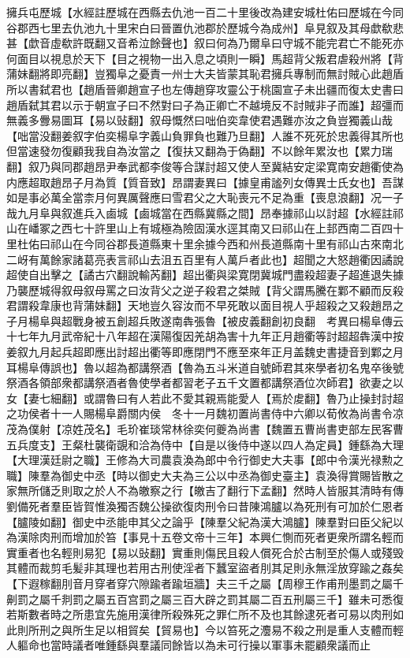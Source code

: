 擁兵屯歷城【水經註歷城在西縣去仇池一百二十里後改為建安城杜佑曰歷城在今同谷郡西七里去仇池九十里宋白曰晉置仇池郡於歷城今為成州】阜見叙及其母歔欷悲甚【歔音虛欷許既翻又音希泣餘聲也】叙曰何為乃爾阜曰守城不能完君亡不能死亦何面目以視息於天下【目之視物一出入息之頃則一瞬】馬超背父叛君虐殺州將【背蒲妹翻將即亮翻】豈獨阜之憂責一州士大夫皆蒙其恥君擁兵專制而無討賊心此趙盾所以書弑君也【趙盾晉卿趙宣子也左傳趙穿攻靈公于桃園宣子未出疆而復太史書曰趙盾弑其君以示于朝宣子曰不然對曰子為正卿亡不越境反不討賊非子而誰】超彊而無義多釁易圖耳【易以䜴翻】叙母慨然曰咄伯奕韋使君遇難亦汝之負豈獨義山哉【咄當没翻姜叙字伯奕楊阜字義山負罪負也難乃旦翻】人誰不死死於忠義得其所也但當速發勿復顧我我自為汝當之【復扶又翻為于偽翻】不以餘年累汝也【累力瑞翻】叙乃與同郡趙昂尹奉武都李俊等合謀討超又使人至冀結安定梁寛南安趙衢使為内應超取趙昂子月為質【質音致】昂謂妻異曰【據皇甫謐列女傳異士氏女也】吾謀如是事必萬全當柰月何異厲聲應曰雪君父之大恥喪元不足為重【喪息浪翻】况一子哉九月阜與叙進兵入鹵城【鹵城當在西縣冀縣之間】昂奉據祁山以討超【水經註祁山在嶓冢之西七十許里山上有城極為險固漢水逕其南又曰祁山在上邽西南二百四十里杜佑曰祁山在今同谷郡長道縣東十里余據今西和州長道縣南十里有祁山古來南北二岈有萬餘家諸葛亮表言祁山去沮五百里有人萬戶者此也】超聞之大怒趙衢因譎說超使自出擊之【譎古穴翻說輸芮翻】超出衢與梁寛閉冀城門盡殺超妻子超進退失據乃襲歷城得叙母叙母罵之曰汝背父之逆子殺君之桀賊【背父謂馬騰在鄴不顧而反殺君謂殺韋康也背蒲妹翻】天地豈久容汝而不早死敢以面目視人乎超殺之又殺趙昂之子月楊阜與超戰身被五創超兵敗遂南犇張魯【被皮義翻創初良翻　考異曰楊阜傳云十七年九月武帝紀十八年超在漢陽復因羌胡為害十九年正月趙衢等討超超犇漢中按姜叙九月起兵超即應出討超出衢等即應閉門不應至來年正月盖魏史書捷音到鄴之月耳楊阜傳誤也】魯以超為都講祭酒【魯為五斗米道自號師君其來學者初名鬼卒後號祭酒各領部衆都講祭酒者魯使學者都習老子五千文置都講祭酒位次師君】欲妻之以女【妻七細翻】或謂魯曰有人若此不愛其親焉能愛人【焉於䖍翻】魯乃止操封討超之功侯者十一人賜楊阜爵關内侯　冬十一月魏初置尚書侍中六卿以荀攸為尚書令凉茂為僕射【凉姓茂名】毛玠崔琰常林徐奕何夔為尚書【魏置五曹尚書吏部左民客曹五兵度支】王粲杜襲衛覬和洽為侍中【自是以後侍中遂以四人為定員】鍾繇為大理【大理漢廷尉之職】王修為大司農袁渙為郎中令行御史大夫事【郎中令漢光禄勲之職】陳羣為御史中丞【時以御史大夫為三公以中丞為御史臺主】袁渙得賞賜皆散之家無所儲乏則取之於人不為皦察之行【皦吉了翻行下孟翻】然時人皆服其清時有傳劉備死者羣臣皆賀惟渙獨否魏公操欲復肉刑令曰昔陳鴻臚以為死刑有可加於仁恩者【臚陵如翻】御史中丞能申其父之論乎【陳羣父紀為漢大鴻臚】陳羣對曰臣父紀以為漢除肉刑而增加於笞【事見十五卷文帝十三年】本興仁惻而死者更衆所謂名輕而實重者也名輕則易犯【易以䜴翻】實重則傷民且殺人償死合於古制至於傷人或殘毁其體而裁剪毛髪非其理也若用古刑使淫者下蠶室盜者刖其足則永無淫放穿踰之姦矣【下遐稼翻刖音月穿者穿穴隙踰者踰垣牆】夫三千之屬【周穆王作甫刑墨罰之屬千劓罰之屬千剕罰之屬五百宫罰之屬三百大辟之罰其屬二百五刑屬三千】雖未可悉復若斯數者時之所患宜先施用漢律所殺殊死之罪仁所不及也其餘逮死者可易以肉刑如此則所刑之與所生足以相貿矣【貿易也】今以笞死之灋易不殺之刑是重人支體而輕人軀命也當時議者唯鍾繇與羣議同餘皆以為未可行操以軍事未罷顧衆議而止

